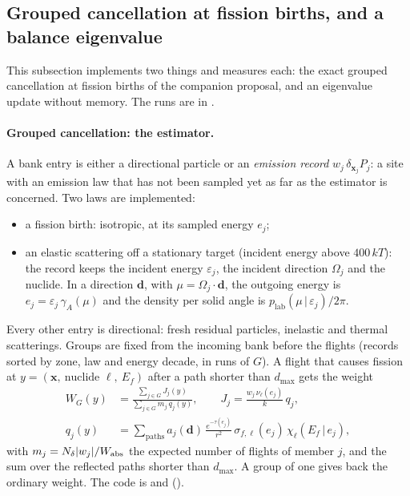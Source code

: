 \subsection{Grouped cancellation at fission births, and a balance eigenvalue}\label{sec:res:grouped}

This subsection implements two things and measures each: the exact grouped cancellation at fission
births of the companion proposal, and an eigenvalue update without memory. The runs are in
.

\paragraph{Grouped cancellation: the estimator.} A bank entry is either a directional particle or an
\emph{emission record} $w_j\,\delta_{\mathbf x_j}P_j$: a site with an emission law that has not been
sampled yet as far as the estimator is concerned. Two laws are implemented:
\begin{itemize}
\item a fission birth: isotropic, at its sampled energy $e_j$;
\item an elastic scattering off a stationary target (incident energy above $400\,kT$): the record
  keeps the incident energy $\varepsilon_j$, the incident direction $\Omega_j$ and the nuclide. In a
  direction $\mathbf d$, with $\mu=\Omega_j\!\cdot\!\mathbf d$, the outgoing energy is
  $e_j=\varepsilon_j\,\gamma_A(\mu)$ and the density per solid angle is
  $p_{\text{lab}}(\mu\,|\,\varepsilon_j)/2\pi$.
\end{itemize}
Every other entry is directional: fresh residual particles, inelastic and thermal scatterings.
Groups are fixed from the incoming bank before the flights (records sorted by zone, law and energy
decade, in runs of $G$). A flight that causes fission at
$y=(\mathbf x,\ \text{nuclide }\ell,\ E_f)$ after a path shorter than $d_{\max}$ gets the weight
\begin{align}
W_G(y)&=\frac{\sum_{j\in G}J_j(y)}{\sum_{j\in G}m_j\,q_j(y)},\qquad
J_j=\frac{w_j\,\nu_\ell(e_j)}{k}\,q_j ,\\
q_j(y)&=\sum_{\text{paths}}a_j(\mathbf d)\,\frac{e^{-\tau(e_j)}}{r^2}\,\sigma_{f,\ell}(e_j)\,\chi_\ell(E_f\,|\,e_j),
\end{align}
with $m_j=N_\delta|w_j|/W_{\mathrm{abs}}$ the expected number of flights of member $j$, and the sum over the
reflected paths shorter than $d_{\max}$. A group of one gives back the ordinary weight. The code is
 and 
().

